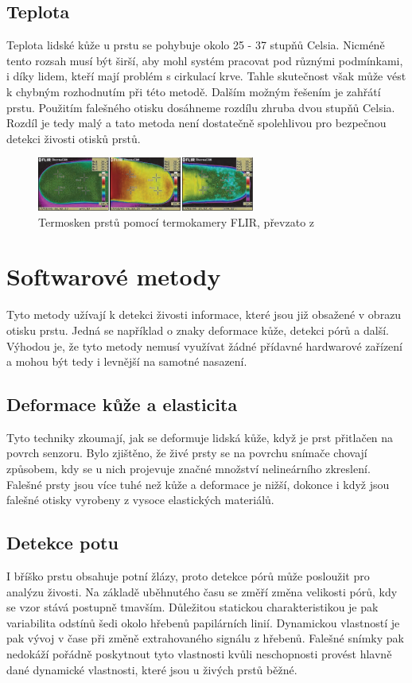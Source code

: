 \subsection{Teplota}
Teplota lidské kůže u prstu se pohybuje okolo 25 - 37 stupňů Celsia. Nicméně tento rozsah musí být širší, aby mohl systém pracovat pod různými podmínkami, i díky lidem, kteří mají problém s cirkulací krve. Tahle skutečnost však může vést k chybným rozhodnutím při této metodě. Dalším možným řešením je zahřátí prstu. Použitím falešného otisku dosáhneme rozdílu zhruba dvou stupňů Celsia. Rozdíl je tedy malý a tato metoda není dostatečně spolehlivou pro bezpečnou detekci živosti otisků prstů. \cite{AdvancedBiometricsTechnologies2011}
\begin{figure}[!htbp]
    \centering
    \includegraphics[width=270px]{obrazky-figures/thermoscan.PNG}
    \caption{Termosken prstů pomocí termokamery FLIR, převzato z \cite{AdvancedBiometricsTechnologies2011}}
\end{figure}

\section{Softwarové metody}
Tyto metody užívají k detekci živosti informace, které jsou již obsažené v obrazu otisku prstu. Jedná se například o znaky deformace kůže, detekci pórů a další. Výhodou je, že tyto metody nemusí využívat žádné přídavné hardwarové zařízení a mohou být tedy i levnější na samotné nasazení.

\subsection{Deformace kůže a elasticita}
Tyto techniky zkoumají, jak se deformuje lidská kůže, když je prst přitlačen na povrch senzoru. Bylo zjištěno, že živé prsty se na povrchu snímače chovají způsobem, kdy se u nich projevuje značné množství nelineárního zkreslení. Falešné prsty jsou více tuhé než kůže a deformace je nižší, dokonce i když jsou falešné otisky vyrobeny z vysoce elastických materiálů. \cite{BiometricsEncyclopedia2009}

\subsection{Detekce potu}
I bříško prstu obsahuje potní žlázy, proto detekce pórů může posloužit pro analýzu živosti. Na základě uběhnutého času se změří změna velikosti pórů, kdy se vzor stává postupně tmavším. Důležitou statickou charakteristikou je pak variabilita odstínů šedi okolo hřebenů papilárních linií. Dynamickou vlastností je pak vývoj v čase při změně extrahovaného signálu z hřebenů. Falešné snímky pak nedokáží pořádně poskytnout tyto vlastnosti kvůli neschopnosti provést hlavně dané dynamické vlastnosti, které jsou u živých prstů běžné. \cite{PoresResearch}

